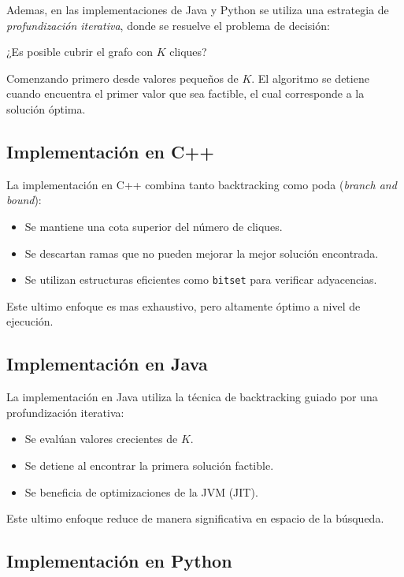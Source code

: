 Ademas, en las implementaciones de Java y Python se utiliza una estrategia de \textit{profundización iterativa}, donde se resuelve el problema de decisión:

\begin{center}
¿Es posible cubrir el grafo con $K$ cliques?
\end{center}

Comenzando primero desde valores pequeños de $K$. El algoritmo se detiene cuando encuentra el primer valor que sea factible, el cual corresponde a la solución óptima.

\subsection{Implementación en C++}

La implementación en C++ combina tanto backtracking como poda (\textit{branch and bound}):

\begin{itemize}
    \item Se mantiene una cota superior del número de cliques.
    \item Se descartan ramas que no pueden mejorar la mejor solución encontrada.
    \item Se utilizan estructuras eficientes como \texttt{bitset} para verificar adyacencias.
\end{itemize}

Este ultimo enfoque es mas exhaustivo, pero altamente óptimo a nivel de ejecución.

\subsection{Implementación en Java}

La implementación en Java utiliza la técnica de backtracking guiado por una profundización iterativa:

\begin{itemize}
    \item Se evalúan valores crecientes de $K$.
    \item Se detiene al encontrar la primera solución factible.
    \item Se beneficia de optimizaciones de la JVM (JIT).
\end{itemize}

Este ultimo enfoque reduce de manera significativa en espacio de la búsqueda.

\subsection{Implementación en Python}

